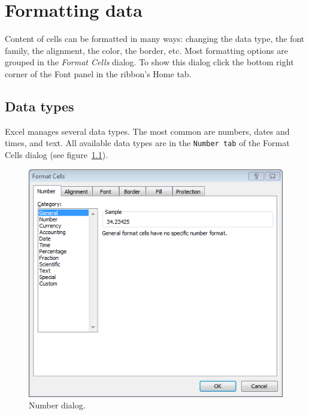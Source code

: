 
\chapter{Formatting data}

Content of cells can be formatted in many ways: changing the data type, the font family, the alignment, the color, the
border, etc. Most formatting options are grouped in the \emph{Format Cells} dialog. To show this dialog click the bottom
right corner of the Font panel in the ribbon's Home tab.

\section{Data types}\hypertarget{data-types}{}\label{data-types}

Excel manages several data types. The most common are numbers, dates and times, and text. All available data types are
in the \texttt{Number tab} of the Format Cells dialog (see figure~\ref{img-number_dialog}).

\begin{figure}[htbp]
\begin{center}
\includegraphics[scale=0.7]{../img/number_dialog.png}
\end{center}
\caption{Number dialog.}
\label{img-number_dialog}
\end{figure}

